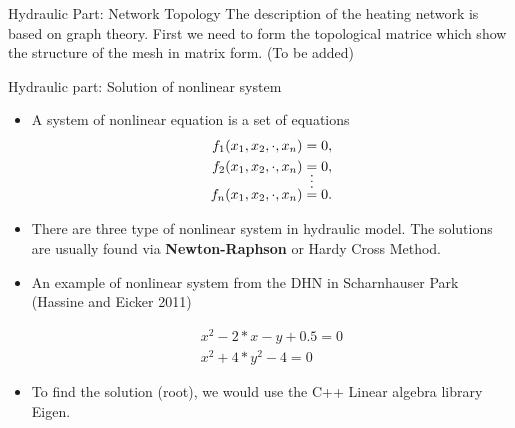 \documentclass[xcolor=dvipsnames]{beamer}
\begin{document}
\begin{frame}{Hydraulic Part: Network Topology}
The description of the heating network is based on graph theory. First we need to form the topological matrice which show the structure of the mesh in matrix form. (To be added)


\end{frame}

\begin{frame}{Hydraulic part: Solution of nonlinear system }

\begin{itemize}
	\item A system of nonlinear equation is a set of equations 
	\begin{align*}
		f_1(x_1,x_2,\cdot,x_n)&=0,\\
		f_2(x_1,x_2,\cdot,x_n)&=0,\\
		&\shortvdotswithin{=}
		f_n(x_1,x_2,\cdot,x_n)&=0.
	\end{align*}
	\item There are three type of nonlinear system in hydraulic model. The solutions are usually found via 
	\textbf{Newton-Raphson} or Hardy Cross Method.

	\item An example of nonlinear system from the DHN in Scharnhauser Park (Hassine and Eicker 2011)

	\begin{align*}
		x^2-2*x-y+0.5=0\\
		x^2+4*y^2-4=0
	\end{align*}

	\item To find the solution (root), we would use the C++ Linear algebra library {\color{purple}Eigen}.  %

\end{itemize}
\end{frame}
\end{document}
